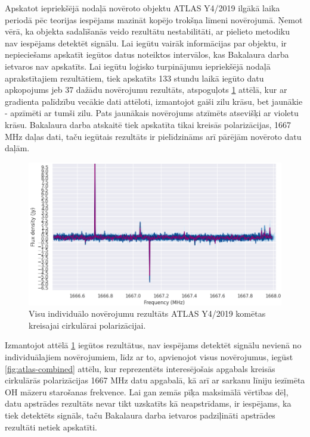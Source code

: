 Apskatot iepriekšējā nodaļā novēroto objektu ATLAS Y4/2019 ilgākā laika periodā pēc teorijas iespējams mazināt kopējo trokšņa līmeni novērojumā. Ņemot vērā, ka objekta sadalīšanās veido rezultātu nestabilitāti, ar pielieto metodiku nav iespējams detektēt signālu. Lai iegūtu vairāk informācijas par objektu, ir nepieciešams apskatīt iegūtos datus noteiktos intervālos, kas Bakalaura darba ietvaros nav apskatīts. Lai iegūtu loģisko turpinājumu iepriekšējā nodaļā aprakstītajiem rezultātiem, tiek apskatīts 133 stundu laikā iegūto datu apkopojums jeb 37 dažādu novērojumu rezultāts, atspoguļots \ref{fig:atlas-individ} attēlā, kur ar gradienta palīdzību vecākie dati attēloti, izmantojot gaiši zilu krāsu, bet jaunākie - apzīmēti ar tumši zilu. Pats jaunākais novērojums atzīmēts atsevišķi ar violetu krāsu.
Bakalaura darba atskaitē tiek apskatīta tikai kreisās polarizācijas, 1667 MHz daļas dati, taču iegūtais rezultāts ir pielīdzināms arī pārējām novēroto datu daļām.
\begin{figure}[H]
\centering
\includegraphics[width=\textwidth]{images/created/atlas-individ.png}
\caption{Visu individuālo novērojumu rezultāts ATLAS Y4/2019 komētas kreisajai cirkulārai polarizācijai.}
\label{fig:atlas-individ}
\end{figure}


Izmantojot attēlā \ref{fig:atlas-individ} iegūtos rezultātus, nav iespējams detektēt signālu nevienā no individuālajiem novērojumiem, līdz ar to, apvienojot visus novērojumus, iegūst \ref{fig:atlas-combined} attēlu, kur reprezentēts interesējošais apgabals kreisās cirkulārās polarizācijas 1667 MHz datu apgabalā, kā arī ar sarkanu līniju iezīmēta OH māzeru starošanas frekvence. Lai gan zemās pīķa maksimālā vērtības dēļ, datu apstrādes rezultāts nevar tikt uzskatīts kā neapstrīdams, ir iespējams, ka tiek detektēts signāls, taču Bakalaura darba ietvaros padziļināti apstrādes rezultāti netiek apskatīti. 

